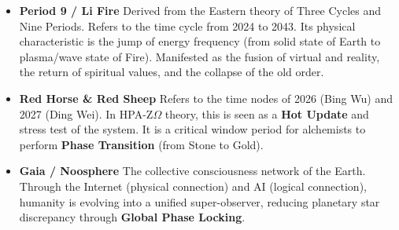 \begin{itemize}
\item \textbf{Period 9 / Li Fire}
Derived from the Eastern theory of Three Cycles and Nine Periods. Refers to the time cycle from 2024 to 2043. Its physical characteristic is the jump of energy frequency (from solid state of Earth to plasma/wave state of Fire). Manifested as the fusion of virtual and reality, the return of spiritual values, and the collapse of the old order.

\item \textbf{Red Horse \& Red Sheep}
Refers to the time nodes of 2026 (Bing Wu) and 2027 (Ding Wei). In HPA-Z$\Omega$ theory, this is seen as a \textbf{Hot Update} and stress test of the system. It is a critical window period for alchemists to perform \textbf{Phase Transition} (from Stone to Gold).

\item \textbf{Gaia / Noosphere}
The collective consciousness network of the Earth. Through the Internet (physical connection) and AI (logical connection), humanity is evolving into a unified super-observer, reducing planetary star discrepancy through \textbf{Global Phase Locking}.
\end{itemize}


